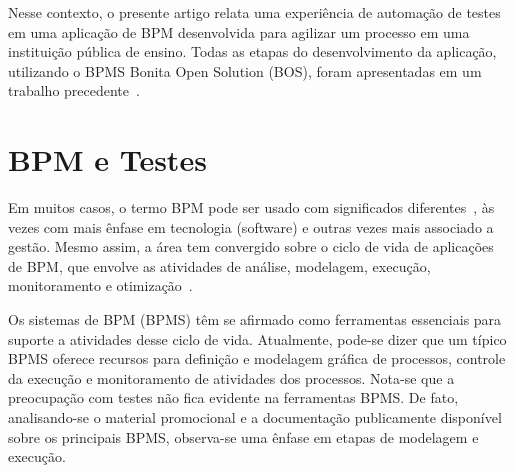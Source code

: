 \documentclass[12pt]{article}
\begin{document}
Nesse contexto, o presente artigo relata uma experiência de automação de testes em uma aplicação de BPM desenvolvida para agilizar um processo em uma instituição pública de ensino. Todas as etapas do desenvolvimento da aplicação, utilizando o BPMS Bonita Open Solution (BOS), foram apresentadas em um trabalho precedente~\cite{sbsi2013}. 

\section{BPM e Testes}

Em muitos casos, o termo BPM pode ser usado com significados diferentes~\cite{acmxrds2009}, às vezes com mais ênfase em tecnologia (software) e outras vezes mais associado a gestão. Mesmo assim, a área tem convergido sobre o ciclo de vida de aplicações de BPM, que envolve as atividades de análise, modelagem, execução, monitoramento e otimização~\cite{ABPMP}. 



Os sistemas de BPM (BPMS) têm se afirmado como ferramentas essenciais para suporte a atividades desse ciclo de vida. Atualmente, pode-se dizer que um típico BPMS oferece recursos para definição e modelagem gráfica de processos, controle da execução e monitoramento de atividades dos processos. Nota-se que a preocupação com testes não fica evidente na ferramentas BPMS. De fato, analisando-se o material promocional e a documentação publicamente disponível sobre os principais BPMS, observa-se uma ênfase em etapas de modelagem e execução.
\end{document}
